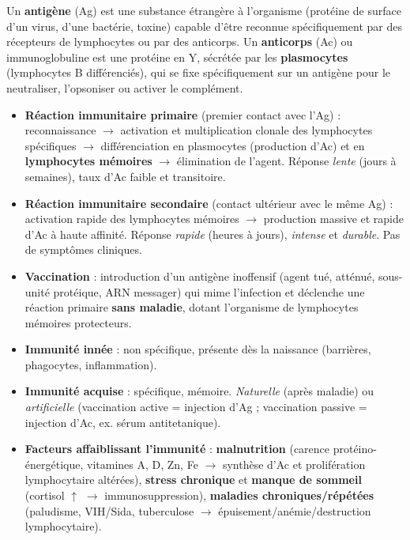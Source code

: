\documentclass[11pt]{article}
\begin{document}
\begin{definition}
Un \textbf{antigène} (Ag) est une substance étrangère à l'organisme (protéine de surface d'un virus, d'une bactérie, toxine) capable d'être reconnue spécifiquement par des récepteurs de lymphocytes ou par des anticorps. Un \textbf{anticorps} (Ac) ou immunoglobuline est une protéine en Y, sécrétée par les \textbf{plasmocytes} (lymphocytes B différenciés), qui se fixe spécifiquement sur un antigène pour le neutraliser, l'opsoniser ou activer le complément.
\end{definition}

\begin{propriete}
\begin{itemize}
\item \textbf{Réaction immunitaire primaire} (premier contact avec l'Ag) : reconnaissance $\rightarrow$ activation et multiplication clonale des lymphocytes spécifiques $\rightarrow$ différenciation en plasmocytes (production d'Ac) et en \textbf{lymphocytes mémoires} $\rightarrow$ élimination de l'agent. Réponse \emph{lente} (jours à semaines), taux d'Ac faible et transitoire.
\item \textbf{Réaction immunitaire secondaire} (contact ultérieur avec le même Ag) : activation rapide des lymphocytes mémoires $\rightarrow$ production massive et rapide d'Ac à haute affinité. Réponse \emph{rapide} (heures à jours), \emph{intense} et \emph{durable}. Pas de symptômes cliniques.
\item \textbf{Vaccination} : introduction d'un antigène inoffensif (agent tué, atténué, sous-unité protéique, ARN messager) qui mime l'infection et déclenche une réaction primaire \textbf{sans maladie}, dotant l'organisme de lymphocytes mémoires protecteurs.
\end{itemize}
\end{propriete}

\begin{aretenir}
\begin{itemize}
\item \textbf{Immunité innée} : non spécifique, présente dès la naissance (barrières, phagocytes, inflammation).
\item \textbf{Immunité acquise} : spécifique, mémoire. \emph{Naturelle} (après maladie) ou \emph{artificielle} (vaccination active = injection d'Ag ; vaccination passive = injection d'Ac, ex. sérum antitetanique).
\item \textbf{Facteurs affaiblissant l'immunité} : \textbf{malnutrition} (carence protéino-énergétique, vitamines A, D, Zn, Fe $\rightarrow$ synthèse d'Ac et prolifération lymphocytaire altérées), \textbf{stress chronique} et \textbf{manque de sommeil} (cortisol $\uparrow$ $\rightarrow$ immunosuppression), \textbf{maladies chroniques/répétées} (paludisme, VIH/Sida, tuberculose $\rightarrow$ épuisement/anémie/destruction lymphocytaire).
\end{itemize}
\end{aretenir}
\end{document}
